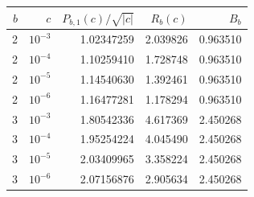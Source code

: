 \begin{tabular}{@{}rrrrr@{}}
\toprule
$b$ & $c$ & $P_{b,1}(c)/\sqrt{|c|}$ & $R_b(c)$ & $B_b$\\
\midrule
2 & $10^{-3}$ & 1.02347259 & 2.039826 & 0.963510\\
2 & $10^{-4}$ & 1.10259410 & 1.728748 & 0.963510\\
2 & $10^{-5}$ & 1.14540630 & 1.392461 & 0.963510\\
2 & $10^{-6}$ & 1.16477281 & 1.178294 & 0.963510\\
3 & $10^{-3}$ & 1.80542336 & 4.617369 & 2.450268\\
3 & $10^{-4}$ & 1.95254224 & 4.045490 & 2.450268\\
3 & $10^{-5}$ & 2.03409965 & 3.358224 & 2.450268\\
3 & $10^{-6}$ & 2.07156876 & 2.905634 & 2.450268\\
\bottomrule
\end{tabular}
